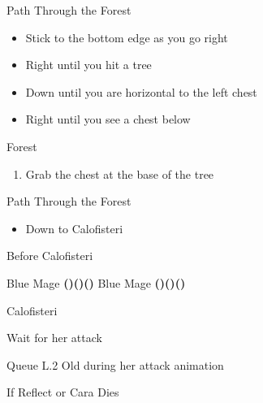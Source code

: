 \begin{paracol}{2}
\begin{misc}{Path Through the Forest}
    \begin{itemize}
        \item Stick to the bottom edge as you go right
        \item Right until you hit a tree
        \item Down until you are horizontal to the left chest
        \item Right until you see a chest below
    \end{itemize}
\end{misc}

\switchcolumn
\begin{steproute}{Forest}
\end{steproute}

\switchcolumn*
\begin{enumerate}[resume]
    \item Grab the  chest at the base of the tree
\end{enumerate}

\begin{misc}{Path Through the Forest}
    \begin{itemize}
        \item Down to Calofisteri
    \end{itemize}
\end{misc}

\begin{menu}{Before Calofisteri}
    \varwb
    \begin{jobMenu}
        \faris Blue Mage \textbf{(\pointDown)(\pointLeft)(\pointDown)} \equip{\runningShoes}
        \cara Blue Mage \textbf{(\pointDown)(\pointLeft)(\pointDown)}
    \end{jobMenu}
    \varwe
\end{menu}

\begin{boss}{Calofisteri}
    \varwb
    \begin{round}{1}
        \item Wait for her attack
        \item Queue L.2 Old during her attack animation
    \end{round}
    \begin{round}{2}
        \faris \leftCommand{\blue} \then \ltwoOld
        \item {}
        \item {}
        \cara \leftCommand{\blue} \then \lfiveDeath
    \end{round}
    \begin{bossPart}{If Reflect or Cara Dies}
        \lenna \leftCommand{\dimenAbility} \then \reset
    \end{bossPart}
    \varwe
\end{boss}


\end{paracol}
